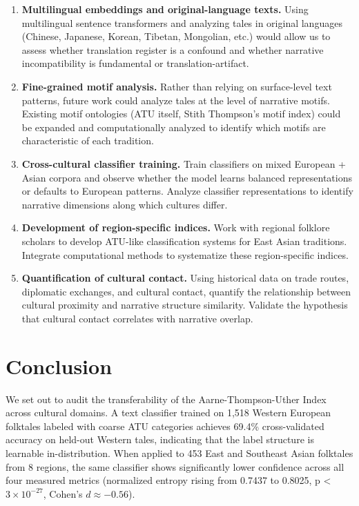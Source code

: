 \documentclass{article}
\begin{document}
\begin{enumerate}
\item \textbf{Multilingual embeddings and original-language texts.} Using multilingual sentence transformers and analyzing tales in original languages (Chinese, Japanese, Korean, Tibetan, Mongolian, etc.) would allow us to assess whether translation register is a confound and whether narrative incompatibility is fundamental or translation-artifact.

\item \textbf{Fine-grained motif analysis.} Rather than relying on surface-level text patterns, future work could analyze tales at the level of narrative motifs. Existing motif ontologies (ATU itself, Stith Thompson's motif index) could be expanded and computationally analyzed to identify which motifs are characteristic of each tradition.

\item \textbf{Cross-cultural classifier training.} Train classifiers on mixed European + Asian corpora and observe whether the model learns balanced representations or defaults to European patterns. Analyze classifier representations to identify narrative dimensions along which cultures differ.

\item \textbf{Development of region-specific indices.} Work with regional folklore scholars to develop ATU-like classification systems for East Asian traditions. Integrate computational methods to systematize these region-specific indices.

\item \textbf{Quantification of cultural contact.} Using historical data on trade routes, diplomatic exchanges, and cultural contact, quantify the relationship between cultural proximity and narrative structure similarity. Validate the hypothesis that cultural contact correlates with narrative overlap.

\end{enumerate}

\section{Conclusion}

We set out to audit the transferability of the Aarne-Thompson-Uther Index across cultural domains. A text classifier trained on 1,518 Western European folktales labeled with coarse ATU categories achieves 69.4\% cross-validated accuracy on held-out Western tales, indicating that the label structure is learnable in-distribution. When applied to 453 East and Southeast Asian folktales from 8 regions, the same classifier shows significantly lower confidence across all four measured metrics (normalized entropy rising from 0.7437 to 0.8025, p < $3 \times 10^{-27}$, Cohen's $d \approx -0.56$).
\end{document}
